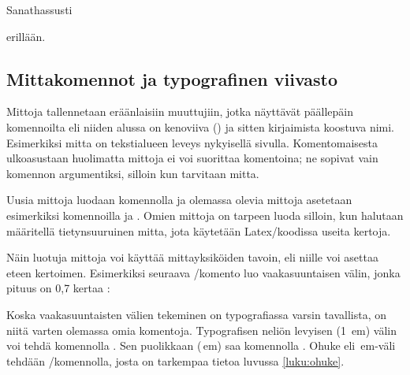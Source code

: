 \begin{tulossis}
  Sanat\hspace{1.2cm}hassusti  \nopagebreak
  \vspace{2mm}

  \hspace{1.75em}erillään.
\end{tulossis}

\subsection{Mittakomennot ja typografinen viivasto}

Mittoja tallennetaan eräänlaisiin muuttujiin, jotka näyttävät päällepäin
komennoilta eli niiden alussa on kenoviiva (\koodi{\keno}) ja sitten
kirjaimista koostuva nimi. Esimerkiksi mitta 
on teks\-ti\-alueen leveys nykyisellä sivulla. Komentomaisesta
ulko\-asus\-taan huolimatta mittoja ei voi suorittaa komentoina; ne
sopivat vain komennon argumentiksi, silloin kun tarvitaan mitta.

Uusia mittoja luodaan komennolla  ja olemassa
olevia mittoja asetetaan esimerkiksi komennoilla  ja . Omien mittoja on
tarpeen luoda silloin, kun halutaan määritellä tietynsuuruinen mitta,
jota käytetään Latex\-/koodissa useita kertoja.

\begin{koodilohkosis}
  \newlength{\omamitta}         %
  \setlength{\omamitta}{2.3em}  %
  \addtolength{\omamitta}{1em}  %
  \addtolength{\omamitta}{-1em} %
\end{koodilohkosis}

Näin luotuja mittoja voi käyttää mittayksiköiden tavoin, eli niille voi
asettaa eteen kertoimen. Esimerkiksi seuraava \-/komento luo vaakasuuntaisen välin, jonka pituus on 0,7
kertaa :

\begin{koodilohkosis}
  \hspace{0.7\omamitta}
\end{koodilohkosis}

Koska vaakasuuntaisten välien tekeminen on typografiassa varsin
tavallista, on niitä varten olemassa omia komentoja. Typografisen neliön
levyisen (1~em) välin voi tehdä komennolla . Sen
puolikkaan (\,em) saa komennolla . Ohuke eli \,em-väli tehdään
\koodi{\keno,}\-/komennolla, josta on tarkempaa tietoa luvussa
\ref{luku:ohuke}.

